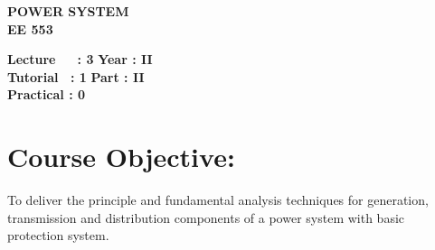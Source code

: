 \begin{center}
    \textbf{\huge{\uppercase{Power System}}}
    \\
    \vspace{.5cm}
    \textbf{\large{EE 553}}
\end{center}

\noindent\textbf{Lecture\ \ \ : 3} \hfill \textbf{Year : II } \\
\textbf{Tutorial \ : 1} \hfill \textbf{Part : II } \\
\textbf{Practical : 0}  \\

\par
\noindent 
\section*{Course Objective:}
To deliver the principle and fundamental analysis techniques for generation, transmission and distribution components of a power system with basic protection system.


